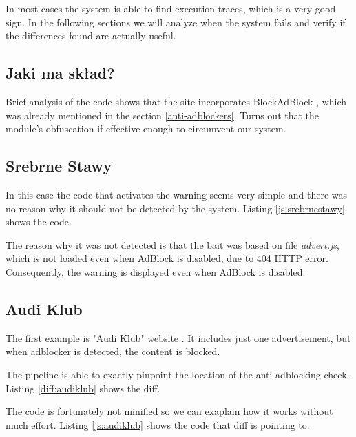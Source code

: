 In most cases the system is able to find execution traces, which is a very good sign.
In the following sections we will analyze when the system fails and verify if the differences
found are actually useful.

\subsection{Jaki ma skład?}

Brief analysis of the code shows that the site incorporates BlockAdBlock \cite{github:blockadblock}, which was
already mentioned in the section \ref{anti-adblockers}. Turns out that the module's obfuscation if effective enough 
to circumvent our system.

\subsection{Srebrne Stawy}

In this case the code that activates the warning seems very simple and there was no reason why
it should not be detected by the system. Listing \ref{js:srebrnestawy} shows the code.



The reason why it was not detected is that the bait was based on file \emph{advert.js}, which is not loaded 
even when AdBlock is disabled, due to 404 HTTP error. Consequently, the warning is displayed even 
when AdBlock is disabled.

\subsection{Audi Klub}
\label{audiklub}

The first example is "Audi Klub" website . It includes just one advertisement, but when adblocker
is detected, the content is blocked.

The pipeline is able to exactly pinpoint the location of the anti-adblocking check.
Listing \ref{diff:audiklub} shows the diff.



The code is fortunately not minified so we can exaplain how it works without much effort.
Listing \ref{js:audiklub} shows the code that diff is pointing to.

